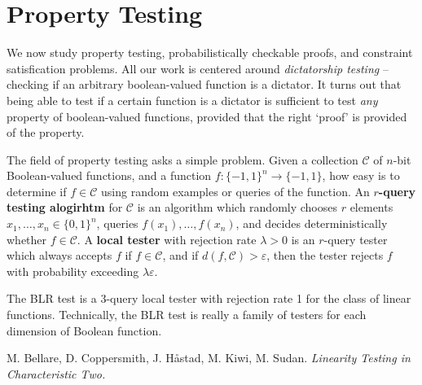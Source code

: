 \chapter{Property Testing}

We now study property testing, probabilistically checkable proofs, and constraint satisfication problems. All our work is centered around {\it dictatorship testing} -- checking if an arbitrary boolean-valued function is a dictator. It turns out that being able to test if a certain function is a dictator is sufficient to test {\it any} property of boolean-valued functions, provided that the right `proof' is provided of the property.

The field of property testing asks a simple problem. Given a collection $\mathcal{C}$ of $n$-bit Boolean-valued functions, and a function $f: \{ -1, 1 \}^n \to \{ -1, 1 \}$, how easy is to determine if $f \in \mathcal{C}$ using random examples or queries of the function. An {\bf $r$-query testing alogirhtm} for $\mathcal{C}$ is an algorithm which randomly chooses $r$ elements $x_1, \dots, x_n \in \{ 0, 1 \}^n$, queries $f(x_1), \dots, f(x_n)$, and decides deterministically whether $f \in \mathcal{C}$. A {\bf local tester} with rejection rate $\lambda > 0$ is an $r$-query tester which always accepts $f$ if $f \in \mathcal{C}$, and if $d(f,\mathcal{C}) > \varepsilon$, then the tester rejects $f$ with probability exceeding $\lambda \varepsilon$.

\begin{example}
    The BLR test is a 3-query local tester with rejection rate 1 for the class of linear functions. Technically, the BLR test is really a family of testers for each dimension of Boolean function.
\end{example}






\begin{thebibliography}{9}

M. Bellare, D. Coppersmith, J. H\r{a}stad, M. Kiwi, M. Sudan.
\textit{Linearity Testing in Characteristic Two.}

\end{thebibliography}

